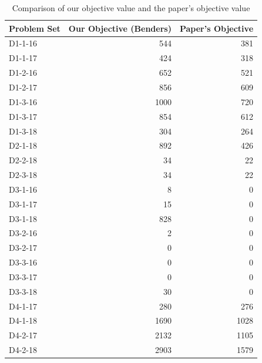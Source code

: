 \documentclass{article}
\begin{document}
\begin{table}[htb]
    \centering
    \begin{tabular}{|l|r|r|}
        \hline
        \textbf{Problem Set} & \textbf{Our Objective (Benders)} & \textbf{Paper's Objective} \\
        \hline
        D1-1-16 & 544 & 381 \\
        D1-1-17 & 424 & 318 \\
        D1-2-16 & 652 & 521 \\
        D1-2-17 & 856 & 609 \\
        D1-3-16 & 1000 & 720 \\
        D1-3-17 & 854 & 612 \\
        D1-3-18 & 304 & 264 \\
        D2-1-18 & 892 & 426 \\
        D2-2-18 & 34 & 22 \\
        D2-3-18 & 34 & 22 \\
        D3-1-16 & 8 & 0 \\
        D3-1-17 & 15 & 0 \\  
        D3-1-18 & 828 & 0 \\
        D3-2-16 & 2 & 0 \\
        D3-2-17 & 0 & 0 \\
        D3-3-16 & 0 & 0 \\
        D3-3-17 & 0 & 0 \\
        D3-3-18 & 30 & 0 \\
        D4-1-17 & 280 & 276 \\
        D4-1-18 & 1690 & 1028 \\
        D4-2-17 & 2132 & 1105 \\
        D4-2-18 & 2903 & 1579 \\
        \hline
    \end{tabular}
    \caption{Comparison of our objective value and the paper's objective value}
    \label{tab:comparison}
\end{table}
\end{document}
